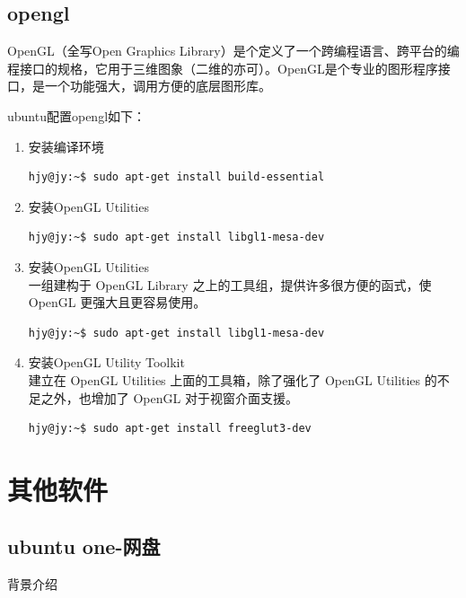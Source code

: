 \subsection{opengl}
OpenGL（全写Open Graphics Library）是个定义了一个跨编程语言、跨平台的编程接口的规格，它用于三维图象（二维的亦可）。OpenGL是个专业的图形程序接口，是一个功能强大，调用方便的底层图形库。

ubuntu配置opengl如下：
\begin{enumerate}
\item 安装编译环境
\begin{lstlisting}[style=BASH]
hjy@jy:~$ sudo apt-get install build-essential
\end{lstlisting}

\item 安装OpenGL Utilities
\begin{lstlisting}[style=BASH]
hjy@jy:~$ sudo apt-get install libgl1-mesa-dev
\end{lstlisting}

\item 安装OpenGL Utilities\\
一组建构于 OpenGL Library 之上的工具组，提供许多很方便的函式，使 OpenGL 更强大且更容易使用。
\begin{lstlisting}[style=BASH]
hjy@jy:~$ sudo apt-get install libgl1-mesa-dev
\end{lstlisting}

\item 安装OpenGL Utility Toolkit\\
建立在 OpenGL Utilities 上面的工具箱，除了强化了 OpenGL Utilities 的不足之外，也增加了 OpenGL 对于视窗介面支援。
\begin{lstlisting}[style=BASH]
hjy@jy:~$ sudo apt-get install freeglut3-dev
\end{lstlisting}

\end{enumerate}


\clearpage
\section{其他软件}
\subsection{ubuntu one-网盘}
背景介绍\\

